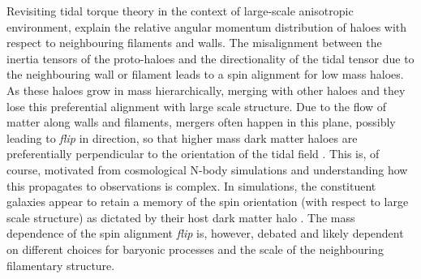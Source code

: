 Revisiting tidal torque theory \citep[TTT; e.g.][]{hoyle1951, peebles1969} in the context of large-scale anisotropic environment, \citet{codis2015} explain the relative angular momentum distribution of haloes with respect to neighbouring filaments and walls. The misalignment between the inertia tensors of the proto-haloes and the directionality of the tidal tensor due to the neighbouring wall or filament leads to a spin alignment for low mass haloes. As these haloes grow in mass hierarchically, merging with other haloes and they lose this preferential alignment with large scale structure. Due to the flow of matter along walls and filaments, mergers often happen in this plane, possibly leading to \textit{flip} in direction, so that higher mass dark matter haloes are preferentially perpendicular to the orientation of the tidal field \citep[e.g.][]{Codis2012, dubois2014, GaneshaiahVeena2018}. This is, of course, motivated from cosmological N-body simulations and understanding how this propagates to observations is complex. In simulations, the constituent galaxies appear to retain a memory of the spin orientation (with respect to large scale structure) as dictated by their host dark matter halo \citep[e.g.][]{codis2018, Kraljic2019flip}. The mass dependence of the spin alignment \textit{flip} is, however, debated and likely dependent on different choices for baryonic processes and the scale of the neighbouring filamentary structure.

